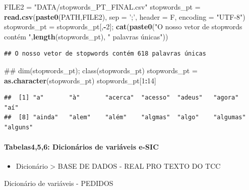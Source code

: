 \documentclass[]{article}
\newenvironment{Shaded}{\begin{snugshade}}{\end{snugshade}}
\newcommand{\KeywordTok}[1]{\textcolor[rgb]{0.13,0.29,0.53}{\textbf{#1}}}
\newcommand{\DataTypeTok}[1]{\textcolor[rgb]{0.13,0.29,0.53}{#1}}
\newcommand{\DecValTok}[1]{\textcolor[rgb]{0.00,0.00,0.81}{#1}}
\newcommand{\StringTok}[1]{\textcolor[rgb]{0.31,0.60,0.02}{#1}}
\newcommand{\OperatorTok}[1]{\textcolor[rgb]{0.81,0.36,0.00}{\textbf{#1}}}
\newcommand{\NormalTok}[1]{#1}
\providecommand{\tightlist}{%
  \setlength{\itemsep}{0pt}\setlength{\parskip}{0pt}}
\let\oldparagraph\paragraph
\renewcommand{\paragraph}[1]{\oldparagraph{#1}\mbox{}}
\begin{document}
\begin{Shaded}
\begin{Highlighting}[]
\NormalTok{FILE2 =}\StringTok{ "DATA/stopwords_PT_FINAL.csv"}
\NormalTok{stopwords_pt =}\StringTok{ }\KeywordTok{read.csv}\NormalTok{(}\KeywordTok{paste0}\NormalTok{(PATH,FILE2), }\DataTypeTok{sep =} \StringTok{';'}\NormalTok{, }\DataTypeTok{header =}\NormalTok{ F, }\DataTypeTok{encoding =} \StringTok{"UTF-8"}\NormalTok{)}
\NormalTok{stopwords_pt =}\StringTok{ }\NormalTok{stopwords_pt[,}\OperatorTok{-}\DecValTok{2}\NormalTok{]; }
\KeywordTok{cat}\NormalTok{(}\KeywordTok{paste0}\NormalTok{(}\StringTok{"O nosso vetor de stopwords contém "}\NormalTok{,}\KeywordTok{length}\NormalTok{(stopwords_pt), }\StringTok{" palavras únicas"}\NormalTok{))}
\end{Highlighting}
\end{Shaded}

\begin{verbatim}
## O nosso vetor de stopwords contém 618 palavras únicas
\end{verbatim}

\begin{Shaded}
\begin{Highlighting}[]
\NormalTok{## dim(stopwords_pt); class(stopwords_pt)}
\NormalTok{stopwords_pt =}\StringTok{ }\KeywordTok{as.character}\NormalTok{(stopwords_pt)}
\NormalTok{stopwords_pt[}\DecValTok{1}\OperatorTok{:}\DecValTok{14}\NormalTok{]}
\end{Highlighting}
\end{Shaded}

\begin{verbatim}
##  [1] "a"       "à"       "acerca"  "acesso"  "adeus"   "agora"   "aí"     
##  [8] "ainda"   "alem"    "além"    "algmas"  "algo"    "algumas" "alguns"
\end{verbatim}

\paragraph{Tabelas4,5,6: Dicionários de variáveis
e-SIC}\label{tabelas456-dicionarios-de-variaveis-e-sic}

\begin{itemize}
\tightlist
\item
  Dicionário \textgreater{} BASE DE DADOS - REAL PRO TEXTO DO TCC
\end{itemize}

Dicionário de variáveis - PEDIDOS
\end{document}
